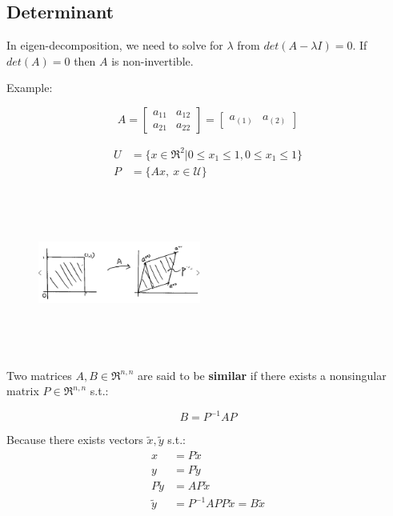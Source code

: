 \subsection{Determinant}

In eigen-decomposition, we need to solve for $\lambda$ from $det(A - \lambda I) = 0$. 
If $det(A) = 0$ then $A$ is non-invertible. 

Example:

$$A = 
\left[
\begin{matrix}
a_{11} & a_{12}\\
a_{21} & a_{22}
\end{matrix}
\right] =
\left[
\begin{matrix}
a_{(1)} & a_{(2)}
\end{matrix}
\right]
$$

\begin{align*}
U &= \{x\in \Re^2 | 0\leq x_1 \leq 1, 0\leq x_1 \leq 1 \}\\
P &= \{Ax, \ x\in \mathcal{U}\} 
\end{align*}

\begin{figure}
	\centering
	\includegraphics[width=2.1in,height=2.1in]{figures/ch03/figure1.jpg}
\end{figure}


Two matrices $A, B \in \Re^{n, n}$ are said to be \textbf{similar} if there exists a nonsingular matrix $P\in \Re^{n,n}$ s.t.:

\begin{equation*}
B = P^{-1}AP
\end{equation*}

Because there exists vectors $\tilde{x}, \tilde{y}$ s.t.:
\begin{align}
x &= P\tilde{x}\\
y &= P\tilde{y}\\
P\tilde{y} &= A P\tilde{x}\\
\tilde{y} &= P^{-1}AP P\tilde{x} = B \tilde{x}
\end{align}

